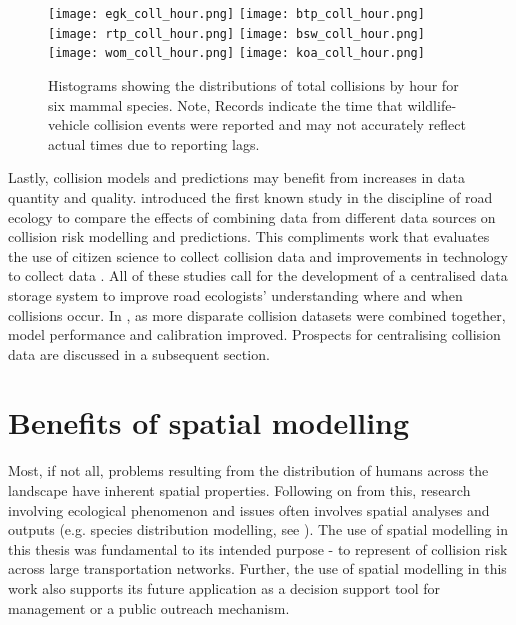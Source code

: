 \begin{figure*}[htp]
  \centering
	\begin{minipage}[t]{.9\textwidth}
    	\centering
    	\texttt{[image: egk\_coll\_hour.png]}\hspace{.05\textwidth}
    	\texttt{[image: btp\_coll\_hour.png]}\\ 
    	\texttt{[image: rtp\_coll\_hour.png]}\hspace{.05\textwidth}
    	\texttt{[image: bsw\_coll\_hour.png]}\\
    	\texttt{[image: wom\_coll\_hour.png]}\hspace{.05\textwidth}
    	\texttt{[image: koa\_coll\_hour.png]}
    \end{minipage}
  \caption[Total collisions by hour for six mammal species]{Histograms showing the distributions of total collisions by hour for six mammal species. Note, Records indicate the time that wildlife-vehicle collision events were reported and may not accurately reflect actual times due to reporting lags.}
  \label{temporal_all}
\end{figure*}

Lastly, collision models and predictions may benefit from increases in data quantity and quality.  introduced the first known study in the discipline of road ecology to compare the effects of combining data from different data sources on collision risk modelling and predictions. This compliments work that evaluates the use of citizen science to collect collision data \citep{paul14, dwye16} and improvements in technology to collect data \cite{olso14}. All of these studies call for the development of a centralised data storage system to improve road ecologists' understanding where and when collisions occur. In , as more disparate collision datasets were combined together, model performance and calibration improved. Prospects for centralising collision data are discussed in a subsequent section. 

\section{Benefits of spatial modelling}

Most, if not all, problems resulting from the distribution of humans across the landscape have inherent spatial properties. Following on from this, research involving ecological phenomenon and issues often involves spatial analyses and outputs (e.g. species distribution modelling, see \cite{}). The use of spatial modelling in this thesis was fundamental to its intended purpose - to represent of collision risk across large transportation networks. Further, the use of spatial modelling in this work also supports its future application as a decision support tool for management or a public outreach mechanism.

